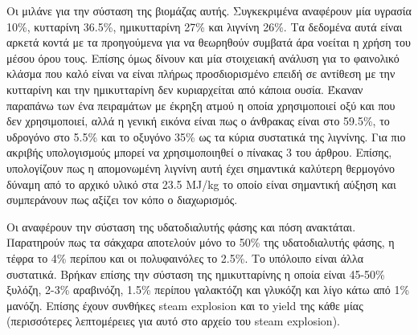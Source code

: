 \documentclass[11pt]{article}
\begin{document}
\begin{description}
Οι \cite{fernandez-bolanosCharacterizationLigninObtained1999} μιλάνε για την σύσταση της βιομάζας αυτής. Συγκεκριμένα αναφέρουν μία υγρασία 10\%, κυτταρίνη 36.5\%, ημικυτταρίνη 27\% και λιγνίνη 26\%. Τα δεδομένα αυτά είναι αρκετά κοντά με τα προηγούμενα για να θεωρηθούν συμβατά άρα νοείται η χρήση του μέσου όρου τους. Επίσης όμως δίνουν και μία στοιχειακή ανάλυση για το φαινολικό κλάσμα που καλό είναι να είναι πλήρως προσδιορισμένο επειδή σε αντίθεση με την κυτταρίνη και την ημικυτταρίνη δεν κυριαρχείται από κάποια ουσία. Έκαναν παραπάνω των ένα πειραμάτων με έκρηξη ατμού η οποία χρησιμοποιεί οξύ και που δεν χρησιμοποιεί, αλλά η γενική εικόνα είναι πως ο άνθρακας είναι στο 59.5\%, το υδρογόνο στο 5.5\% και το οξυγόνο 35\% ως τα κύρια συστατικά της λιγνίνης. Για πιο ακριβής υπολογισμούς μπορεί να χρησιμοποιηθεί ο πίνακας 3 του άρθρου. Επίσης, υπολογίζουν πως η απομονωμένη λιγνίνη αυτή έχει σημαντικά καλύτερη θερμογόνο δύναμη από το αρχικό υλικό στα 23.5 MJ/kg το οποίο είναι σημαντική αύξηση και συμπεράνουν πως αξίζει τον κόπο ο διαχωρισμός.

Οι \cite{fernandez-bolanosSteamexplosionOliveStones2001} αναφέρουν την σύσταση της υδατοδιαλυτής φάσης και πόση ανακτάται. Παρατηρούν πως τα σάκχαρα αποτελούν μόνο το 50\% της υδατοδιαλυτής φάσης, η τέφρα το 4\% περίπου και οι πολυφαινόλες το 2.5\%. Το υπόλοιπο είναι άλλα συστατικά. Βρήκαν επίσης την σύσταση της ημικυτταρίνης η οποία είναι 45-50\% ξυλόζη, 2-3\% αραβινόζη, 1.5\% περίπου γαλακτόζη και γλυκόζη και λίγο κάτω από 1\% μανόζη. Επίσης έχουν συνθήκες steam explosion και το yield της κάθε μίας (περισσότερες λεπτομέρειες για αυτό στο αρχείο του steam explosion).
\end{description}
\end{document}
